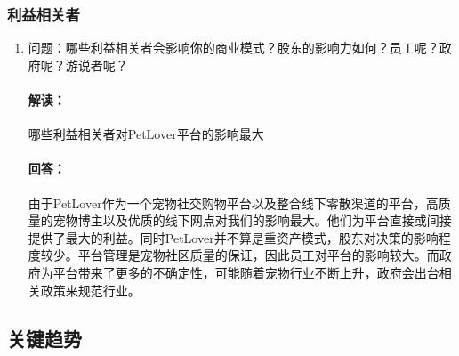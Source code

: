 \documentclass[a4paper]{ctexart}
\begin{document}
\subsubsection{利益相关者}
\begin{enumerate}[label=\alph*.]
  \item 问题：哪些利益相关者会影响你的商业模式？股东的影响力如何？员工呢？政府呢？游说者呢？
  \paragraph{解读：}哪些利益相关者对PetLover平台的影响最大
  \paragraph{回答：}由于PetLover作为一个宠物社交购物平台以及整合线下零散渠道的平台，高质量的宠物博主以及优质的线下网点对我们的影响最大。他们为平台直接或间接提供了最大的利益。同时PetLover并不算是重资产模式，股东对决策的影响程度较少。平台管理是宠物社区质量的保证，因此员工对平台的影响较大。而政府为平台带来了更多的不确定性，可能随着宠物行业不断上升，政府会出台相关政策来规范行业。
 \end{enumerate}
\subsection{关键趋势}
\end{document}
